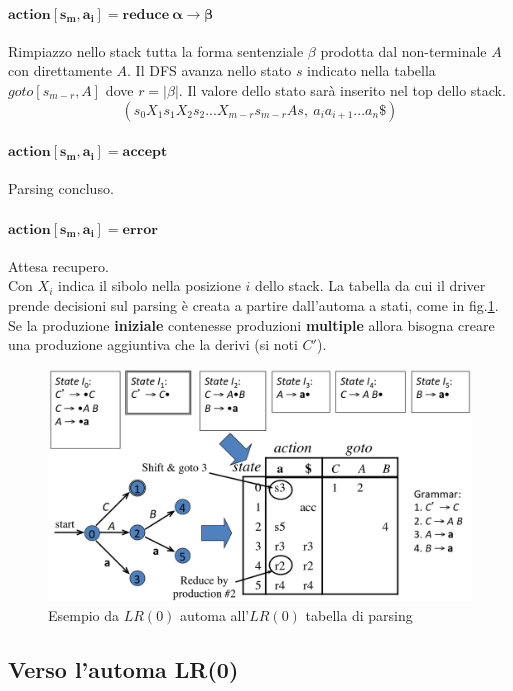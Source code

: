 \paragraph{$\mathbf{action[s_m,a_i]=reduce \ \alpha \to \beta}$}
Rimpiazzo nello stack tutta la forma sentenziale $\beta$ prodotta dal
non-terminale $A$ con direttamente $A$. Il DFS avanza nello stato $s$ indicato
nella tabella $goto[s_{m-r},A]$ dove $r=|\beta|$. Il valore dello stato sar\`a
inserito nel top dello stack.
$$(s_0X_1s_1X_2s_2...X_{m-r}s_{m-r}As,\ a_ia_{i+1}...a_n\$)$$

\paragraph{$\mathbf{action[s_m,a_i]=accept}$}
Parsing concluso.

\paragraph{$\mathbf{action[s_m,a_i]=error}$}
Attesa recupero. \\

Con $X_i$ indica il sibolo nella posizione $i$ dello stack. La tabella da cui il
driver prende decisioni sul parsing \`e creata a partire dall'automa a stati,
come in fig.\ref{img:from_DFA_to_table}. Se la produzione \textbf{iniziale}
contenesse produzioni \textbf{multiple} allora bisogna creare una produzione
aggiuntiva che la derivi (si noti $C'$).

\begin{figure}[H]
\centering
\includegraphics[scale=0.45]{res/image/from_DFA_to_table}
\caption{Esempio da $LR(0)$ automa all'$LR(0)$ tabella di parsing}
\label{img:from_DFA_to_table}
\end{figure}

\subsection{Verso l'automa LR(0)}
